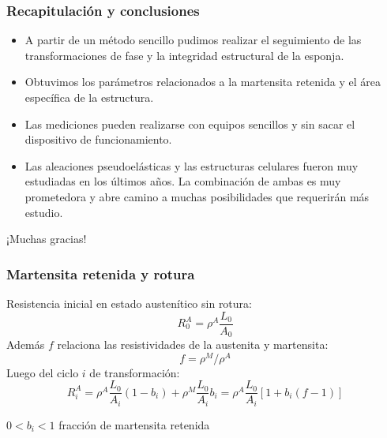 \documentclass[usenames,dvipsnames]{beamer}
\begin{document}
\begin{frame}
\frametitle{Recapitulación y conclusiones}
\begin{small}
\begin{itemize}
\item A partir de un método sencillo pudimos realizar el seguimiento de las transformaciones de fase y la integridad estructural de la esponja. 
\item Obtuvimos los parámetros relacionados a la martensita retenida y el área específica de la estructura.
\item Las mediciones pueden realizarse con equipos sencillos y sin sacar el dispositivo de funcionamiento.
\item Las aleaciones pseudoelásticas y las estructuras celulares fueron muy estudiadas en los últimos años. La combinación de ambas es muy prometedora y abre camino a muchas posibilidades que requerirán más estudio.
\end{itemize}
\end{small}
\end{frame}



\begin{frame}[standout]
 
 ¡Muchas gracias!

 \end{frame}















\appendix
% 
\begin{frame}

\frametitle{Martensita retenida y rotura}

Resistencia inicial en estado austenítico sin rotura: 
\begin{equation*}
 R^A _0 = \rho^A \frac{L_0}{A_0}
\end{equation*}
Además $f$ relaciona las resistividades de la austenita y martensita:
\begin{equation*}
 f=\rho^M / \rho^A
\end{equation*}
Luego del ciclo $i$ de transformación:
\begin{equation*}
R^A _i=\rho^A \frac{L_0}{A_i}(1-b_i) + \rho^M \frac{L_0}{A_i}b_i = \rho^A \frac{L_0}{A_i} [1+ b_i (f-1)]
\end{equation*}

$0<b_i <1$ fracción de martensita retenida

\end{frame}
\end{document}
